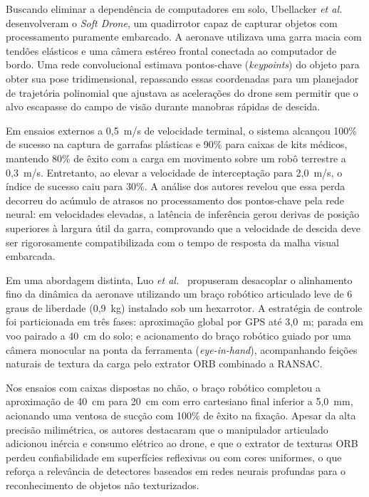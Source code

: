 Buscando eliminar a dependência de computadores em solo, Ubellacker \textit{et al.}~\cite{ubellacker2024} desenvolveram o \textit{Soft Drone}, um quadirrotor capaz de capturar objetos com processamento puramente embarcado. A aeronave utilizava uma garra macia com tendões elásticos e uma câmera estéreo frontal conectada ao computador de bordo. Uma rede convolucional estimava pontos-chave (\textit{keypoints}) do objeto para obter sua pose tridimensional, repassando essas coordenadas para um planejador de trajetória polinomial que ajustava as acelerações do drone sem permitir que o alvo escapasse do campo de visão durante manobras rápidas de descida.

Em ensaios externos a 0,5~m/s de velocidade terminal, o sistema alcançou 100\% de sucesso na captura de garrafas plásticas e 90\% para caixas de kits médicos, mantendo 80\% de êxito com a carga em movimento sobre um robô terrestre a 0,3~m/s. Entretanto, ao elevar a velocidade de interceptação para 2,0~m/s, o índice de sucesso caiu para 30\%. A análise dos autores revelou que essa perda decorreu do acúmulo de atrasos no processamento dos pontos-chave pela rede neural: em velocidades elevadas, a latência de inferência gerou derivas de posição superiores à largura útil da garra, comprovando que a velocidade de descida deve ser rigorosamente compatibilizada com o tempo de resposta da malha visual embarcada.

Em uma abordagem distinta, Luo \textit{et al.}~\cite{luo2020} propuseram desacoplar o alinhamento fino da dinâmica da aeronave utilizando um braço robótico articulado leve de 6 graus de liberdade (0,9~kg) instalado sob um hexarrotor. A estratégia de controle foi particionada em três fases: aproximação global por GPS até 3,0~m; parada em voo pairado a 40~cm do solo; e acionamento do braço robótico guiado por uma câmera monocular na ponta da ferramenta (\textit{eye-in-hand}), acompanhando feições naturais de textura da carga pelo extrator ORB combinado a RANSAC.

Nos ensaios com caixas dispostas no chão, o braço robótico completou a aproximação de 40~cm para 20~cm com erro cartesiano final inferior a 5,0~mm, acionando uma ventosa de sucção com 100\% de êxito na fixação. Apesar da alta precisão milimétrica, os autores destacaram que o manipulador articulado adicionou inércia e consumo elétrico ao drone, e que o extrator de texturas ORB perdeu confiabilidade em superfícies reflexivas ou com cores uniformes, o que reforça a relevância de detectores baseados em redes neurais profundas para o reconhecimento de objetos não texturizados.

